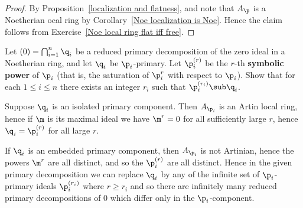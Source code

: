 \begin{proof}
By Proposition~\ref{localization and flatness}, and note that $A_\p$ is a Noetherian ocal ring by Corollary~\ref{Noe localization is Noe}. Hence the claim follows from Exercise~\ref{Noe local ring flat iff free}.
\end{proof}
\begin{exercise}
Let $(0)=\bigcap_{i=1}^{n}\q_i$ be a reduced primary decomposition of the zero ideal in a Noetherian ring, and let $\q_i$ be $\p_i$-primary. Let $\p_i^{(r)}$ be the $r$-th \textbf{symbolic power} of $\p_i$ (that is, the saturation of $\p_i^r$ with respect to $\p_i$). Show that for each $1\leq i\leq n$ there exists an integer $r_i$ such that $
\p_i^{(r_i)}\sub\q_i$.\par
Suppose $\q_i$ is an isolated primary component. Then $A_{\p_i}$ is an Artin local ring, hence if $\m$ is its maximal ideal we have $\m^r=0$ for all sufficiently large $r$, hence $\q_i=\p_i^{(r)}$ for all large $r$.\par
If $\q_i$ is an embedded primary component, then $A_{\p_i}$ is not Artinian, hence the powers $\m^r$ are all distinct, and so the $\p_i^{(r)}$ are all distinct. Hence in the given primary decomposition we can replace $\q_i$ by any of the infinite set of $\p_i$-primary ideals $\p_i^{(r_i)}$ where $r\geq r_i$ and so there are infinitely many reduced primary decompositions of $0$ which differ only in the $\p_i$-component.
\end{exercise}
